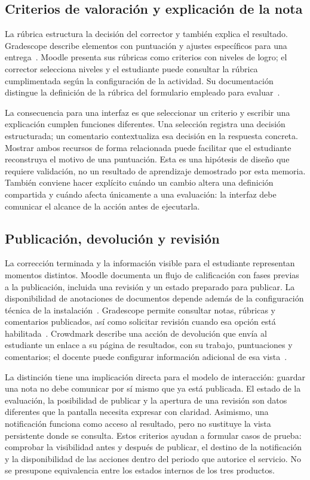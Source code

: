 \subsection{Criterios de valoración y explicación de la nota}

La rúbrica estructura la decisión del corrector y también explica el resultado.
Gradescope describe elementos con puntuación y ajustes específicos para una
entrega~\cite{codex_gradescope_ui}. Moodle presenta sus rúbricas como criterios
con niveles de logro; el corrector selecciona niveles y el estudiante puede
consultar la rúbrica cumplimentada según la configuración de la actividad.
Su documentación distingue la definición de la rúbrica del formulario empleado
para evaluar~\cite{codex_moodle_rubrics}.

La consecuencia para una interfaz es que seleccionar un criterio y escribir una
explicación cumplen funciones diferentes. Una selección registra una decisión
estructurada; un comentario contextualiza esa decisión en la respuesta concreta.
Mostrar ambos recursos de forma relacionada puede facilitar que el estudiante
reconstruya el motivo de una puntuación. Esta es una hipótesis de diseño que
requiere validación, no un resultado de aprendizaje demostrado por esta memoria.
También conviene hacer explícito cuándo un cambio altera una definición compartida
y cuándo afecta únicamente a una evaluación: la interfaz debe comunicar el
alcance de la acción antes de ejecutarla.

\subsection{Publicación, devolución y revisión}

La corrección terminada y la información visible para el estudiante representan
momentos distintos. Moodle documenta un flujo de calificación con fases previas
a la publicación, incluida una revisión y un estado preparado para publicar.
La disponibilidad de anotaciones de documentos depende además de la
configuración técnica de la instalación~\cite{codex_moodle_assignment}.
Gradescope permite consultar notas, rúbricas y comentarios publicados, así como
solicitar revisión cuando esa opción está habilitada~\cite{codex_gradescope_ui}.
Crowdmark describe una acción de devolución que envía al estudiante un enlace
a su página de resultados, con su trabajo, puntuaciones y comentarios; el docente
puede configurar información adicional de esa vista~\cite{codex_crowdmark_return}.

La distinción tiene una implicación directa para el modelo de interacción:
guardar una nota no debe comunicar por sí mismo que ya está publicada. El
estado de la evaluación, la posibilidad de publicar y la apertura de una revisión
son datos diferentes que la pantalla necesita expresar con claridad. Asimismo,
una notificación funciona como acceso al resultado, pero no sustituye la vista
persistente donde se consulta. Estos criterios ayudan a formular casos de prueba:
comprobar la visibilidad antes y después de publicar, el destino de la notificación
y la disponibilidad de las acciones dentro del periodo que autorice el servicio.
No se presupone equivalencia entre los estados internos de los tres productos.


